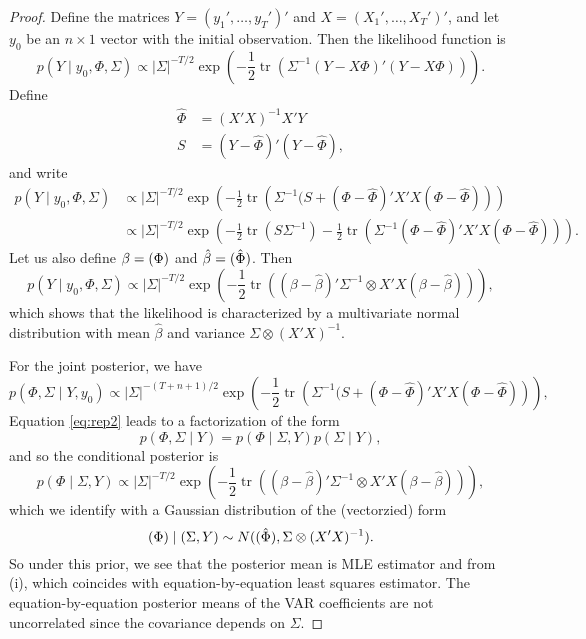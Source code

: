 \documentclass[oneside,reqno]{amsart}
\DeclareMathOperator{\tr}{tr}
\let\vec\relax\DeclareMathOperator{\vec}{vec}
\theoremstyle{definition}
\begin{document}
\begin{enumerate}
\begin{proof}
Define the matrices $Y = (y_1', \dotsc, y_T')'$ and $X = (X_1', \dotsc, X_T')'$, and let $y_0$ be an $n\times 1$ vector with the initial observation. Then the likelihood function is
\[
	p(Y \mid y_0, \Phi, \Sigma) \propto 
	|\Sigma|^{-T/2} \exp\left(-\frac{1}{2} \tr\left(\Sigma^{-1}(Y - X \Phi)' (Y - X \Phi) \right) \right).
\]
Define 
\begin{align*}
	\hat \Phi &= (X'X)^{-1}X'Y \\
	S &= (Y - \hat \Phi)'(Y - \hat \Phi),
\end{align*}
and write 
\begin{align}
	p(Y \mid y_0, \Phi, \Sigma) &\propto 
	|\Sigma|^{-T/2} \exp\left(-\frac{1}{2} \tr\left(\Sigma^{-1}(S + (\Phi - \hat \Phi)'X'X(\Phi - \hat\Phi) \right) \right) \\
	&\propto 
	|\Sigma|^{-T/2} \exp\left(-\frac{1}{2} \tr(S \Sigma^{-1}) - \frac{1}{2}\tr \left(\Sigma^{-1} (\Phi - \hat \Phi)' X'X (\Phi - \hat\Phi) \right) \right). \label{eq:rep2}
\end{align}
Let us also define $\beta = \vec(\Phi)$ and $\hat\beta = \vec(\hat\Phi)$. Then 
\[
	p(Y \mid y_0, \Phi, \Sigma) \propto 
	|\Sigma|^{-T/2}  \exp\left(-\frac{1}{2} \tr\left((\beta - \hat\beta)' \Sigma^{-1} \otimes X'X (\beta - \hat\beta) \right) \right),
\]
which shows that the likelihood is characterized by a multivariate normal distribution with mean $\hat\beta$ and variance  $\Sigma \otimes (X'X)^{-1}$. 
\par
For the joint posterior, we have 
\[
	p(\Phi, \Sigma \mid Y,y_0) \propto 
	|\Sigma|^{-(T+n+1)/2}  \exp\left(-\frac{1}{2} \tr\left(\Sigma^{-1}(S + (\Phi - \hat \Phi)'X'X(\Phi - \hat\Phi) \right) \right),  
\]	 Equation \eqref{eq:rep2} leads to a factorization of the form 
\[
	p(\Phi, \Sigma \mid Y) = p(\Phi \mid \Sigma, Y)p(\Sigma \mid Y),
\]
and so the conditional posterior is
\[
	p(\Phi \mid \Sigma, Y) \propto
	|\Sigma|^{-T/2}  \exp\left(-\frac{1}{2} \tr\left((\beta - \hat\beta)' \Sigma^{-1} \otimes X'X (\beta - \hat\beta) \right) \right),
\]
which we identify with a Gaussian distribution of the (vectorzied) form 
\[
	\vec(\Phi) \mid (\Sigma, Y) \sim N(\vec(\hat\Phi),  \Sigma \otimes (X'X)^{-1}). 
\]
So under this prior, we see that the posterior mean is MLE estimator and from (i), which coincides with equation-by-equation least squares estimator. The equation-by-equation posterior means of the VAR coefficients are not uncorrelated since the covariance depends on $\Sigma$.
\end{proof}



\end{enumerate}
\end{document}
